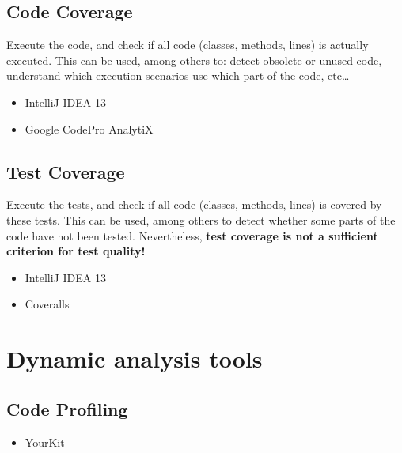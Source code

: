 \documentclass[a4paper,11pt]{report}
\begin{document}
\subsection{Code Coverage}
Execute the code, and check if all code (classes, methods, lines) is actually
executed. This can be used, among others to: detect obsolete or unused code,
understand which execution scenarios use which part of the code, etc\dots

\begin{itemize}
\item IntelliJ IDEA 13
\item Google CodePro AnalytiX
\end{itemize}

\subsection{Test Coverage}
Execute the tests, and check if all code (classes, methods, lines) is covered by
these tests. This can be used, among others to detect whether some parts of the
code have not been tested. Nevertheless, \textbf{test coverage is not a
sufficient criterion for test quality!}

\begin{itemize}
\item IntelliJ IDEA 13
\item Coveralls
\end{itemize}

\section{Dynamic analysis tools}
\subsection{Code Profiling}
\begin{itemize}
\item YourKit
\end{itemize}
\end{document}
